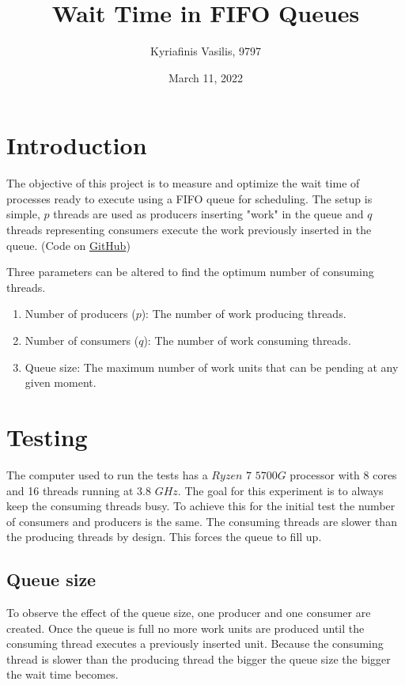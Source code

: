 \documentclass[a4paper, 12pt]{report}
\title{\Large{\textbf{Wait Time in FIFO Queues}}}
\author{Kyriafinis Vasilis, 9797}
\date{March 11, 2022}
\begin{document}
    \maketitle
    
    \section*{Introduction}

    The objective of this project is to measure and optimize the wait time of processes ready to execute
    using a FIFO queue for scheduling. The setup is simple, \(p\) threads are used as producers inserting 
    "work" in the queue and \(q\) threads representing consumers execute the work previously inserted in the 
    queue. (Code on \href{http://www.overleaf.com}{GitHub})

    Three parameters can be altered to find the optimum number of consuming threads.

    \begin{enumerate}
        \item Number of producers (\(p\)): The number of work producing threads.
        \item Number of consumers (\(q\)): The number of work consuming threads.
        \item Queue size: The maximum number of work units that can be pending at any given moment.
    \end{enumerate}


    \section*{Testing}

    The computer used to run the tests has a \(Ryzen\) \(7\) \(5700G\) processor with 8 cores and 16 threads 
    running at \(3.8\) \(GHz\). The goal for this experiment is to always keep the consuming threads busy. To achieve
    this for the initial test the number of consumers and producers is the same. The consuming threads
    are slower than the producing threads by design. This forces the queue to fill up.

    \subsection*{Queue size}

    To observe the effect of the queue size, one producer and one consumer are created. Once the queue is
    full no more work units are produced until the consuming thread executes a previously inserted unit. Because the
    consuming thread is slower than the producing thread the bigger the queue size the bigger the wait time becomes.
    \\
\end{document}
